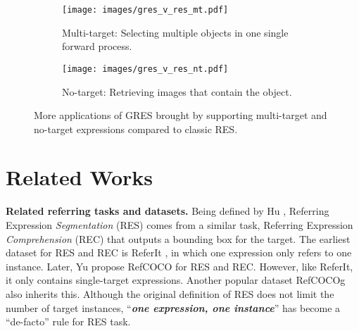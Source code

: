 \documentclass[10pt,twocolumn,letterpaper]{article}
\begin{document}
\begin{figure*}[t]
  \centering
  \vspace{0.35em}
  \hfill
  \begin{subfigure}[t]{0.5\linewidth}
      \centering
      \texttt{[image: images/gres\_v\_res\_mt.pdf]}
      \caption{Multi-target: Selecting multiple objects in one single forward process.}
      \label{fig:app_mt}
  \end{subfigure}
  \hfill
  \begin{subfigure}[t]{0.47\linewidth}
      \centering
      \texttt{[image: images/gres\_v\_res\_nt.pdf]}
      \caption{No-target: Retrieving images that contain the object.}
      \label{fig:app_nt}
  \end{subfigure}
  \hfill
 \vspace{-0.08in}
  \caption{More applications of GRES brought by supporting multi-target and no-target expressions compared to classic RES.}
  \vspace{-0.15in}
  \label{fig:gres_app}
\end{figure*}

\section{Related Works} \label{sec:related_works}
\textbf{Related referring tasks and datasets.} Being defined by Hu \etal \cite{hu2016segmentation}, Referring Expression \textit{Segmentation} (RES) comes from a similar task, Referring Expression \textit{Comprehension} (REC) \cite{hu2016natural,wang2019neighbourhood,liu2019learning,yang2019fast,zhuang2018parallel,yang2020improving,liao2020real} that outputs a bounding box for the target. The earliest dataset for RES and REC is ReferIt \cite{kazemzadeh-etal-2014-referitgame}
, in which one expression only refers to one instance. Later, Yu \etal propose RefCOCO \cite{yu2016modeling} for RES and REC. However, like ReferIt, it only contains single-target expressions. Another popular dataset RefCOCOg \cite{mao2016generation} also inherits this. Although the original definition of RES \cite{hu2016segmentation} does not limit the number of target instances, ``\textbf{\textit{one expression, one instance}}'' has become a ``de-facto'' rule for RES task. 
\end{document}
